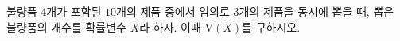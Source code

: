 불량품 $4$개가 포함된 $10$개의 제품 중에서 임의로 $3$개의 제품을 동시에 뽑을 때, 뽑은 불량품의 개수를 확률변수 $X$라 하자. 이때 $\mathrm{V}(X)$를 구하시오.

